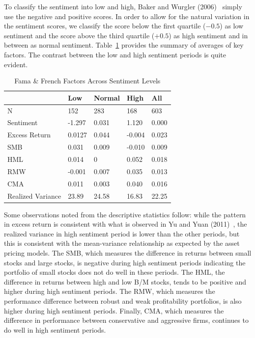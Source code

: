 To classify the sentiment into low and high, Baker and Wurgler (2006)~\cite{baker2006investor} simply use the negative and positive scores. In order to allow for the natural variation in the sentiment scores, we classify the score below the first quartile ($-0.5$) as low sentiment and the score above the third quartile ($+0.5$) as high sentiment and in between as normal sentiment. Table~\ref{tab:famafrench} provides the summary of averages of key factors. The contrast between the low and high sentiment periods is quite evident.


        \begin{table}[!ht]
        \caption{Fama \& French Factors Across Sentiment Levels \label{tab:famafrench}}
        \begin{tabular}{lllll}
        & Low &     Normal      & High & All \\ \hline
        N & 152 &  283  & 168 & 603 \\
        Sentiment & -1.297 &  0.031  & 1.120 & 0.000 \\
        Excess Return & 0.0127 &  0.044  & -0.004 & 0.023 \\ 
        SMB & 0.031 &  0.009  & -0.010 & 0.009 \\
        HML & 0.014 & 0 & 0.052 & 0.018 \\
        RMW & -0.001 &  0.007  & 0.035& 0.013 \\
        CMA & 0.011 &  0.003  & 0.040 & 0.016 \\
        Realized Variance & 23.89 &  24.58  & 16.83 & 22.25
        \end{tabular}
        \end{table}


Some observations noted from the descriptive statistics follow: while the pattern in excess return is consistent with what is observed in Yu and Yuan (2011)~\cite{yuyuan}, the realized variance in high sentiment period is lower than the other periods, but this is consistent with the mean-variance relationship as expected by the asset pricing models. The SMB, which measures the difference in returns between small stocks and large stocks, is negative during high sentiment periods indicating the portfolio of small stocks does not do well in these periods. The HML, the difference in returns between high and low B/M stocks, tends to be positive and higher during high sentiment periods. The RMW, which measures the performance difference between robust and weak profitability portfolios, is also higher during high sentiment periods. Finally, CMA, which measures the difference in performance between conservative and aggressive firms, continues to do well in high sentiment periods.


